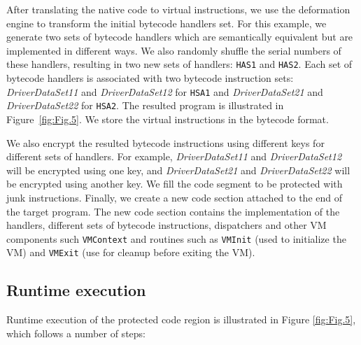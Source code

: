 \documentclass[conference]{IEEEtran}
\begin{document}
After translating the native code to virtual instructions, we use the deformation engine to transform the initial bytecode handlers set. For this example, we generate two sets of bytecode handlers which are semantically equivalent but are implemented in different ways.
We also randomly shuffle the serial numbers of these handlers, resulting in two new sets of handlers: \texttt{HAS1} and \texttt{HAS2}.  Each set of bytecode handlers is associated with two bytecode instruction sets: \emph{DriverDataSet11} and \emph{DriverDataSet12} for \texttt{HSA1} and \emph{DriverDataSet21} and \emph{DriverDataSet22} for \texttt{HSA2}. The resulted program is illustrated in Figure~\ref{fig:Fig.5}. We store the virtual instructions in the bytecode format.


We also encrypt the resulted bytecode instructions using different keys for different sets of handlers.
For example, \emph{DriverDataSet11} and \emph{DriverDataSet12} will be encrypted using one key,
and \emph{DriverDataSet21} and \emph{DriverDataSet22} will be encrypted using another key.
We fill the code segment to be protected with junk instructions.
Finally, we create a new code section attached to the end of the target program.
The new code section contains the implementation of the handlers, different sets of bytecode instructions,
dispatchers and other VM components such \texttt{VMContext} and routines such as
\texttt{VMInit} (used to initialize the VM) and \texttt{VMExit} (use for cleanup before exiting the VM).



\subsection{Runtime execution}

Runtime execution of the protected code region is illustrated in Figure \ref{fig:Fig.5}, which follows a number of steps:
\end{document}
